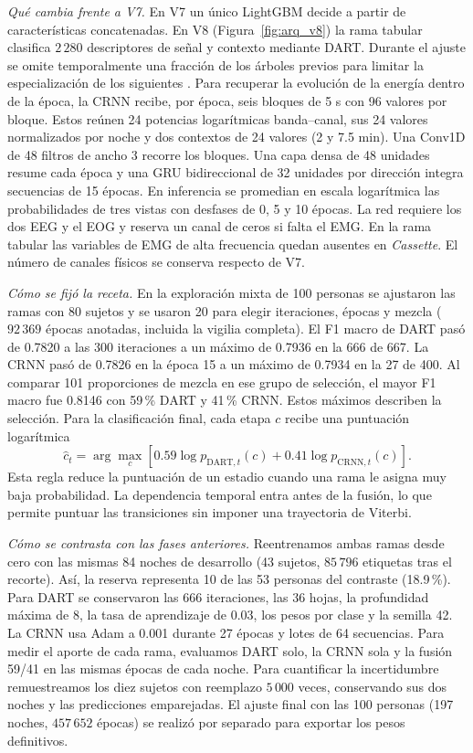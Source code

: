 \documentclass[conference]{IEEEtran}
\begin{document}
\textit{Qué cambia frente a V7.} En V7 un único LightGBM decide a partir de características concatenadas. En V8 (Figura~\ref{fig:arq_v8}) la rama tabular clasifica $2\,280$ descriptores de señal y contexto mediante DART. Durante el ajuste se omite temporalmente una fracción de los árboles previos para limitar la especialización de los siguientes \cite{dart2015}. Para recuperar la evolución de la energía dentro de la época, la CRNN recibe, por época, seis bloques de 5 s con 96 valores por bloque. Estos reúnen 24 potencias logarítmicas banda--canal, sus 24 valores normalizados por noche y dos contextos de 24 valores (2 y 7.5 min). Una Conv1D de 48 filtros de ancho 3 recorre los bloques. Una capa densa de 48 unidades resume cada época y una GRU bidireccional de 32 unidades por dirección integra secuencias de 15 épocas. En inferencia se promedian en escala logarítmica las probabilidades de tres vistas con desfases de 0, 5 y 10 épocas. La red requiere los dos EEG y el EOG y reserva un canal de ceros si falta el EMG. En la rama tabular las variables de EMG de alta frecuencia quedan ausentes en \textit{Cassette}. El número de canales físicos se conserva respecto de V7.

\textit{Cómo se fijó la receta.} En la exploración mixta de 100 personas se ajustaron las ramas con 80 sujetos y se usaron 20 para elegir iteraciones, épocas y mezcla ($92\,369$ épocas anotadas, incluida la vigilia completa). El F1 macro de DART pasó de 0.7820 a las 300 iteraciones a un máximo de 0.7936 en la 666 de 667. La CRNN pasó de 0.7826 en la época 15 a un máximo de 0.7934 en la 27 de 400. Al comparar 101 proporciones de mezcla en ese grupo de selección, el mayor F1 macro fue 0.8146 con 59\,\% DART y 41\,\% CRNN. Estos máximos describen la selección. Para la clasificación final, cada etapa $c$ recibe una puntuación logarítmica
\begin{equation}
\hat{c}_t = \arg\max_c
\left[0.59\log p_{\mathrm{DART},t}(c)
+0.41\log p_{\mathrm{CRNN},t}(c)\right].
\label{eq:fusion_v8}
\end{equation}
Esta regla reduce la puntuación de un estadio cuando una rama le asigna muy baja probabilidad. La dependencia temporal entra antes de la fusión, lo que permite puntuar las transiciones sin imponer una trayectoria de Viterbi.

\textit{Cómo se contrasta con las fases anteriores.} Reentrenamos ambas ramas desde cero con las mismas 84 noches de desarrollo (43 sujetos, $85\,796$ etiquetas tras el recorte). Así, la reserva representa 10 de las 53 personas del contraste (18.9\,\%). Para DART se conservaron las 666 iteraciones, las 36 hojas, la profundidad máxima de 8, la tasa de aprendizaje de 0.03, los pesos por clase y la semilla 42. La CRNN usa Adam a 0.001 durante 27 épocas y lotes de 64 secuencias. Para medir el aporte de cada rama, evaluamos DART solo, la CRNN sola y la fusión 59/41 en las mismas épocas de cada noche. Para cuantificar la incertidumbre remuestreamos los diez sujetos con reemplazo $5\,000$ veces, conservando sus dos noches y las predicciones emparejadas. El ajuste final con las 100 personas (197 noches, $457\,652$ épocas) se realizó por separado para exportar los pesos definitivos.
\end{document}
